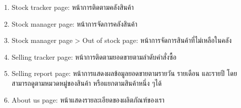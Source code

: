 \begin{enumerate}
    \item Stock tracker page: หน้าการติดตามคลังสินค้า
    \item Stock manager page: หน้าการจัดการคลังสินค้า
    \item Stock manager page > Out of stock page: หน้าการจัดการสินค้าที่ไม่เหลือในคลัง
    \item Selling tracker page: หน้าการติดตามยอดขายตามลำดับคำสั่งซื้อ
    \item Selling report page: หน้าการแสดงผลข้อมูลยอดขายตามรายวัน รายเดือน และรายปี โดยสามารถดูตามหมวดหมู่ของสินค้า หรือแยกตามสินค้าหนึ่ง ๆได้
    \item About us page: หน้าแสดงรายละเอียดของผลิตภัณฑ์ของเรา
\end{enumerate}





